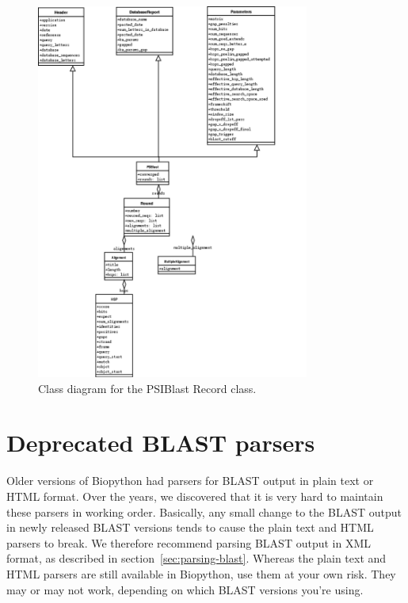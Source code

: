 \documentclass{report}
\begin{document}
\begin{latexonly}
\begin{figure}[htbp]
\centering
\includegraphics[width=0.8\textwidth]{images/PSIBlastRecord.png}
\caption{Class diagram for the PSIBlast Record class.}
\label{fig:psiblastrecord}
\end{figure}
\end{latexonly}

\section{Deprecated BLAST parsers}
\label{sec:parsing-blast-deprecated}

Older versions of Biopython had parsers for BLAST output in plain text or HTML
format. Over the years, we discovered that it is very hard to maintain these
parsers in working order. Basically, any small change to the BLAST output in
newly released BLAST versions tends to cause the plain text and HTML parsers
to break. We therefore recommend parsing BLAST output in XML format, as
described in section~\ref{sec:parsing-blast}.
Whereas the plain text and HTML parsers are still available in
Biopython, use them at your own risk. They may or may not work, depending on
which BLAST versions you're using.
\end{document}

